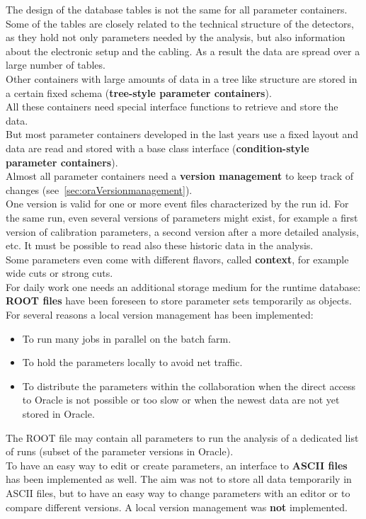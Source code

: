 The design of the database tables is not the same for all parameter containers.\\
Some of the tables are closely related to the technical structure of the detectors, as they hold not only parameters 
needed by the analysis, but also information about the electronic setup and the cabling. As a result the data 
are spread over a large number of tables.\\
Other containers with large amounts of data in a tree like structure are stored in a certain fixed schema 
(\textbf{tree-style parameter containers}).\\
All these containers need special interface functions to retrieve and store the data.\\
But most parameter containers developed in the last years use a fixed layout and data are read and stored with a 
base class interface (\textbf{condition-style parameter containers}).\\

Almost all parameter containers need a \textbf{version management} to keep track of changes 
(see~\ref{sec:oraVersionmanagement}).\\
One version is valid for one or more event files characterized by the run id. For the same run, even several versions 
of parameters might exist, for example a first version of calibration parameters, a second version after a more 
detailed analysis, etc. It must be possible to read also these historic data in the analysis.\\

Some parameters even come with different flavors, called \textbf{context}, for example wide cuts or strong cuts.\\

For daily work one needs an additional storage medium for the runtime database: \textbf{ROOT files} have been 
foreseen to store parameter sets temporarily as objects.\\
For several reasons a local version management has been implemented:
\begin{itemize}
 \item To run many jobs in parallel on the batch farm.
 \item To hold the parameters locally to avoid net traffic.
 \item To distribute the parameters within the collaboration when the direct access to Oracle is not possible or too
   slow or when the newest data are not yet stored in Oracle.
\end{itemize}
The ROOT file may contain all parameters to run the analysis of a dedicated list of runs (subset of the parameter  versions in Oracle).\\ 

To have an easy way to edit or create parameters, an interface to \textbf{ASCII files} has been implemented as well.
The aim was not to store all data temporarily in ASCII files, but to have an easy way to change parameters with an 
editor or to compare different versions. A local version management was \textbf{not} implemented.
